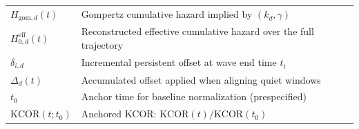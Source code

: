 \documentclass[
]{article}
\begin{document}
\begin{longtable}[]{@{}
  >{\raggedright\arraybackslash}p{}
  >{\raggedright\arraybackslash}p{}@{}}
\(H_{\mathrm{gom},d}(t)\) & Gompertz cumulative hazard implied by \((k_d,\gamma)\) \\
\(H_{0,d}^{\mathrm{eff}}(t)\) & Reconstructed effective cumulative hazard over the full trajectory \\
\(\delta_{i,d}\) & Incremental persistent offset at wave end time \(t_i\) \\
\(\Delta_d(t)\) & Accumulated offset applied when aligning quiet windows \\
\(t_0\) & Anchor time for baseline normalization (prespecified) \\
\(\mathrm{KCOR}(t; t_0)\) & Anchored KCOR: \(\mathrm{KCOR}(t)/\mathrm{KCOR}(t_0)\) \\
\end{longtable}

\newpage
\end{document}
